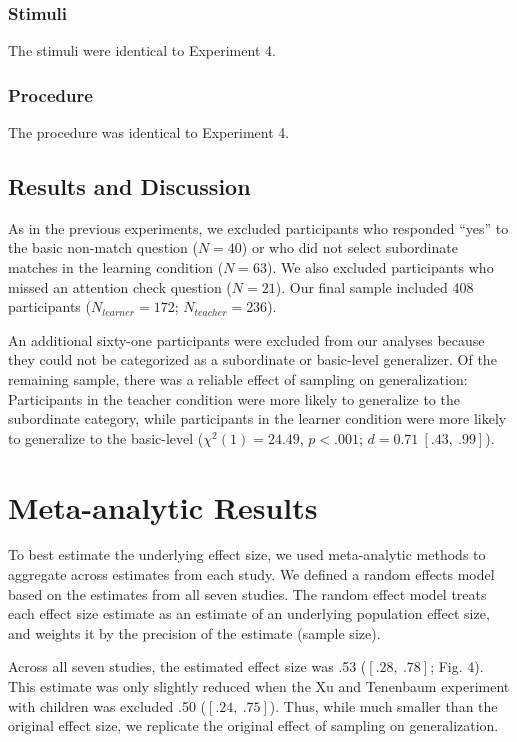 \documentclass[man]{apa2}
\begin{document}
\subsubsection{Stimuli}
The stimuli were identical to Experiment 4.

\subsubsection{Procedure}
The procedure was identical to Experiment 4.

\subsection{Results and Discussion}

As in the previous experiments, we excluded participants who responded ``yes'' to the basic non-match question ($N=40$) or who did not select subordinate matches in the learning condition ($N = 63$). We also excluded participants who missed an attention check question ($N = 21$). Our final sample included 408 participants ($N_{learner} = 172$; $N_{teacher} = 236$).

An additional sixty-one participants were excluded from our analyses because they could not be categorized as a subordinate or basic-level generalizer. Of the remaining sample, there was a reliable effect of sampling on generalization: Participants in the teacher condition were more likely to generalize to the subordinate category, while participants in the learner condition were more likely to generalize to the basic-level ($\chi^2(1) = 24.49$, $p <.001$; $d = 0.71\ [.43,\ .99]$).

\section{Meta-analytic Results}
To best estimate the underlying effect size, we used meta-analytic methods to aggregate across estimates from each study. We defined a random effects model  based on the estimates from all seven studies\cite{Viechtbauer2010}. The random effect model treats each effect size estimate as an estimate of an underlying population effect size, and weights it by the precision of the estimate (sample size). 

Across all seven studies, the estimated effect size was .53 ($[.28,\ .78]$; Fig. 4). This estimate was only slightly reduced when the Xu and Tenenbaum  experiment  with children was excluded  .50 ($[.24,\ .75]$). Thus, while much smaller than the original effect size, we replicate the original effect of sampling on generalization.
\end{document}
